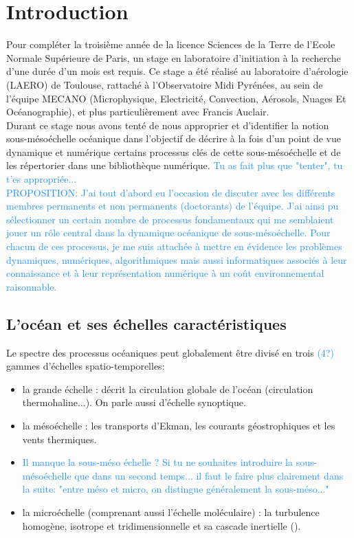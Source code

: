 \documentclass{rapportECC}
\newcommand{\FAadd}[1]{\textcolor{DodgerBlue}{{#1}}}                     %
\begin{document}
\section{Introduction} 

Pour compléter la troisième année de la licence Sciences de la Terre de l'Ecole Normale Supérieure de Paris, un stage en laboratoire d'initiation à la recherche d'une durée d'un mois est requis. Ce stage a été réalisé au laboratoire d'aérologie (LAERO) de Toulouse, rattaché à l'Observatoire Midi Pyrénées, au sein de l'équipe MECANO (Microphysique, Electricité, Convection, Aérosols, Nuages Et Océanographie), et plus particulièrement avec Francis Auclair. \\
Durant ce stage nous avons tenté de nous approprier et d'identifier la notion sous-mésoéchelle océanique dans l'objectif de décrire à la fois d'un point de vue dynamique et numérique certains processus clés de cette sous-mésoéchelle et de les répertorier dans une bibliothèque numérique. \FAadd{Tu as fait plus que "tenter", tu t'es appropriée... }\\
\FAadd{PROPOSITION: J'ai tout d'abord eu l'occasion de discuter avec les différents membres permanents et non permanents (doctorants) de l'équipe. J'ai ainsi pu sélectionner un certain nombre de processus fondamentaux qui me semblaient jouer un rôle central dans la dynamique océanique de sous-mésoéchelle. Pour chacun de ces processus, je me suis attachée à mettre en évidence les problèmes dynamiques, numériques, algorithmiques mais aussi informatiques associés à leur connaissance et à leur représentation numérique à un coût environnemental raisonnable.}

\subsection{L'océan et ses échelles caractéristiques}
Le spectre des processus océaniques peut globalement être divisé en trois \FAadd{(4?)} gammes d'échelles spatio-temporelles:
\begin{itemize}
    \item la grande échelle : décrit la circulation globale de l'océan (circulation thermohaline...). On parle aussi d'échelle synoptique.
    \item la mésoéchelle : les transports d'Ekman, les courants géostrophiques et les vents thermiques.
    \item \FAadd{Il manque la sous-méso échelle ? Si tu ne souhaites introduire la sous-mésoéchelle que dans un second temps... il faut le faire plus clairement dans la suite: "entre méso et micro, on distingue généralement la sous-méso..."}
    \item la microéchelle (comprenant aussi l'échelle moléculaire) : la turbulence homogène, isotrope et tridimensionnelle et sa cascade inertielle (\cite{frisch_turbulence_1995}).
\end{itemize}
\end{document}

